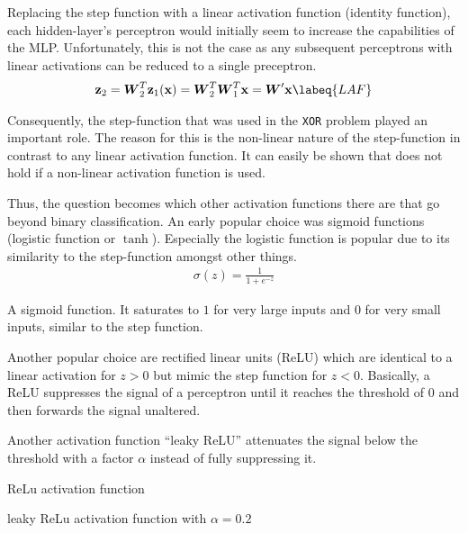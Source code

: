 Replacing the step function with a linear activation function (\eg identity function), each hidden-layer's perceptron would initially seem to increase the capabilities of the MLP.
Unfortunately, this is not the case as any subsequent perceptrons with linear activations can be reduced to a single preceptron.
\begin{align}
    \vec{z}_2 = \mat{W}^T_2 \vec{z}_1(\vec{x}) = \mat{W}^T_2 \mat{W}^T_1 \vec{x} = \mat{W}' \vec{x}
    \labeq{LAF}
\end{align}

Consequently, the step-function that was used in the \lstinline|XOR| problem played an important role.
The reason for this is the non-linear nature of the step-function in contrast to any linear activation function.
It can easily be shown that  does not hold if a non-linear activation function is used.

Thus, the question becomes which other activation functions there are that go beyond binary classification.
An early popular choice was sigmoid functions (logistic function or $\tanh$).
Especially the logistic function is popular due to its similarity to the step-function amongst other things.
\begin{align}
    \sigma(z) = \frac{1}{1 + e^{-z}}
\end{align}
\begin{marginfigure}
    \resizebox{\textwidth}{!}{
        
    }
    \caption{A sigmoid function. It saturates to $1$ for very large inputs and $0$ for very small inputs, similar to the step function.}
\end{marginfigure}

Another popular choice are rectified linear units (ReLU) which are identical to a linear activation for $z > 0$ but mimic the step function for $z < 0$.
Basically, a ReLU suppresses the signal of a perceptron until it reaches the threshold of $0$ and then forwards the signal unaltered.

Another activation function ``leaky ReLU'' attenuates the signal below the threshold with a factor $\alpha$ instead of fully suppressing it.
\begin{marginfigure}
    \resizebox{\textwidth}{!}{
        
    }
    \caption{ReLu activation function}
\end{marginfigure}
\begin{marginfigure}
    \resizebox{\textwidth}{!}{
        
    }
    \caption{leaky ReLu activation function with $\alpha = 0.2$}
\end{marginfigure}

